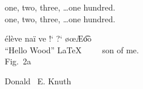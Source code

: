 \documentclass{ctexart}
\begin{document}
            one, two, three, \dots one hundred.\\
            one, two, three, \ldots one hundred.

            \'el\`eve na\"i ve !` ?` \o \oe \AE \t{oo} \textregistered \texttrademark\\

            ``Hello Wood'' \LaTeX \ \ \ \ \ son of me. \\


            Fig.~2a \par
            Donald ~E. Knuth \par
\end{document}
